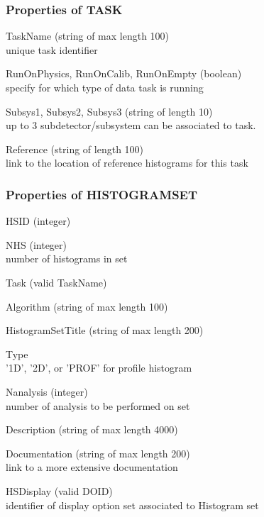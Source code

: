 \documentclass{lhcbnote}
\begin{document}
\subsubsection{Properties of TASK}
\begin{description}
\item{TaskName} (string of max length 100) \\
unique task identifier
\item{RunOnPhysics, RunOnCalib, RunOnEmpty} (boolean)\\
specify for which type of data task is running 
\item{Subsys1, Subsys2, Subsys3} (string of length 10)\\
up to 3 subdetector/subsystem can be associated to task. 
\item{Reference}  (string of length 100)\\
link to the location of reference histograms for this task
\end{description}

\subsubsection{Properties of HISTOGRAMSET}
\begin{description}
\item{HSID} (integer)
\item{NHS} (integer)\\
number of histograms in set
\item{Task} (valid TaskName) 
\item{Algorithm} (string of max length 100) 
\item{HistogramSetTitle} (string of max length 200) 
\item{Type} \\
'1D', '2D', or 'PROF' for profile histogram
\item{Nanalysis} (integer)\\
number of analysis to be performed on set
\item{Description} (string of max length 4000) 
\item{Documentation} (string of max length 200)\\
link to a more extensive documentation
\item{HSDisplay} (valid DOID)\\
identifier of display option set associated to Histogram set 
\end{description}
\end{document}
